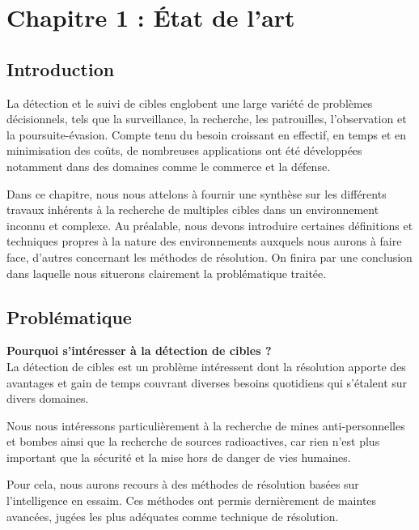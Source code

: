 \chapter{Chapitre 1 : État de l'art} %

\label{Chapter1} %


\section{Introduction}
La détection et le suivi de cibles englobent une large variété de problèmes décisionnels, tels que la surveillance, la recherche, les patrouilles, l’observation et la poursuite-évasion. Compte tenu du besoin croissant en effectif, en temps et en minimisation des coûts, de nombreuses applications ont été développées notamment dans des domaines comme le commerce et la défense.

Dans ce chapitre, nous nous attelons à fournir une synthèse sur les différents travaux inhérents à la recherche de multiples cibles dans un environnement inconnu et complexe. Au préalable, nous devons introduire certaines définitions et techniques propres à la nature des environnements auxquels nous aurons à faire face, d’autres concernant les méthodes de résolution. On finira par une conclusion dans laquelle nous situerons clairement la problématique traitée. 



\section{Problématique} 
\textbf{Pourquoi s'intéresser à la détection de cibles ?}\\

La détection de cibles est un problème intéressent dont la résolution apporte des avantages et gain de temps couvrant diverses besoins quotidiens qui s'étalent sur divers domaines.

Nous nous intéressons particulièrement à la recherche de mines anti-personnelles et bombes ainsi que la recherche de sources radioactives, car rien n’est plus important que la sécurité et la mise hors de danger de vies humaines.

Pour cela, nous aurons recours à des méthodes de résolution basées sur l’intelligence en essaim. Ces méthodes ont permis dernièrement de maintes avancées, jugées les plus adéquates comme technique de résolution.

